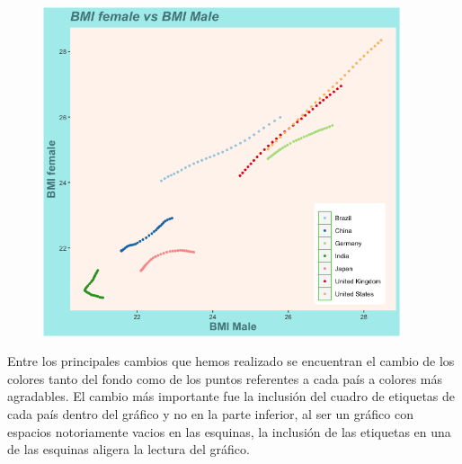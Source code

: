 \documentclass[11pt,a4paper]{article}
\begin{document}
\begin{figure}[!h]
    \centering
    \includegraphics[width=10.5cm]{new/graph3.png}
\end{figure}

Entre los principales cambios que hemos realizado se encuentran el cambio de los colores tanto del fondo como de los puntos referentes a cada país a colores más agradables. El cambio más importante fue la inclusión del cuadro de etiquetas de cada país dentro del gráfico y no en la parte inferior, al ser un gráfico con espacios notoriamente vacios en las esquinas, la inclusión de las etiquetas en una de las esquinas aligera la lectura del gráfico.  
\end{document}
